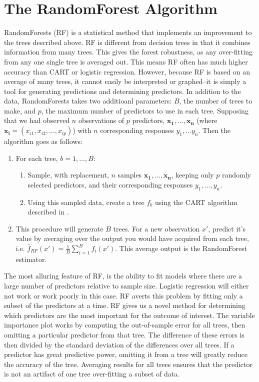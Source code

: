 \documentclass[11pt]{article}
\begin{document}
\section*{The RandomForest Algorithm}
RandomForests (RF) \cite{breiman2001random} is a statistical method that implements an improvement to the trees described above. RF is different from decision trees in that it combines information from many trees. This gives the forest robustness, as any over-fitting from any one single tree is averaged out. This means RF often has much higher accuracy than CART or logistic regression. However, because RF is based on an average of many trees, it cannot easily be interpreted or graphed--it is simply a tool for generating predictions and determining predictors.
In addition to the data, RandomForests takes two additioanl parameters: $B$, the number of trees to make, and $p$, the maximum number of predictors to use in each tree. Supposing that we had observed $n$ observations of $p$ predictors, $\mathbf{x_1}, \dots, \mathbf{x_n}$ (where $\mathbf{x_i} = (x_{i1}, x_{i2}, \dots, x_{ip})$) with $n$ corresponding responses $y_1, \dots y_n$. Then the algorithm goes as follows:
\begin{enumerate}
\item For each tree, $b = 1, \dots, B$:
	\begin{enumerate}
	\item Sample, with replacement, $n$ samples $\mathbf{x_{1}}, \dots, \mathbf{x_{n}}$, keeping only $p$ randomly selected predictors, and their corresponding responses $y_1, \dots, y_n$.
	\item Using this sampled data, create a tree $f_b$ using the CART algorithm described in \cite{breiman1984classification}.
	\end{enumerate}
\item This procedure will generate $B$ trees. For a new observation $x'$, predict it's value by averaging over the output you would have acquired from each tree, i.e. $\hat{f}_{RF} (x') = \frac{1}{B} \sum_{i=1}^B f_i (x')$. This average output is the RandomForest estimator.
\end{enumerate}

The most alluring feature of RF, is the ability to fit models where there are a large number of predictors relative to sample size. Logistic regression will either not work or work poorly in this case. RF averts this problem by fitting only a subset of the predictors at a time. RF gives us a novel method for determining which predictors are the most important for the outcome of interest. The variable importance plot works by computing the out-of-sample error for all trees, then omitting a particular predictor from that tree. The difference of these errors is then divided by the standard deviation of the differences over all trees. If a predictor has great predictive power, omitting it from a tree will greatly reduce the accuracy of the tree. Averaging results for all trees ensures that the predictor is not an artifact of one tree over-fitting a subset of data.
\end{document}
